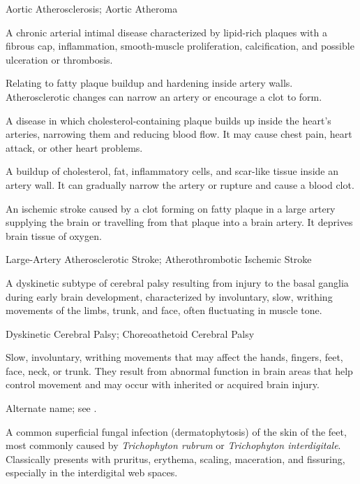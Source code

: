 \synonyms
Aortic Atherosclerosis; Aortic Atheroma

 A chronic arterial intimal disease characterized by lipid-rich plaques with a fibrous cap, inflammation, smooth-muscle proliferation, calcification, and possible ulceration or thrombosis.

 Relating to fatty plaque buildup and hardening inside artery walls. Atherosclerotic changes can narrow an artery or encourage a clot to form.

 A disease in which cholesterol-containing plaque builds up inside the heart’s arteries, narrowing them and reducing blood flow. It may cause chest pain, heart attack, or other heart problems.

 A buildup of cholesterol, fat, inflammatory cells, and scar-like tissue inside an artery wall. It can gradually narrow the artery or rupture and cause a blood clot.

 An ischemic stroke caused by a clot forming on fatty plaque in a large artery supplying the brain or travelling from that plaque into a brain artery. It deprives brain tissue of oxygen.

\synonyms
Large-Artery Atherosclerotic Stroke; Atherothrombotic Ischemic Stroke

 A dyskinetic subtype of cerebral palsy resulting from injury to the basal ganglia during early brain development, characterized by involuntary, slow, writhing movements of the limbs, trunk, and face, often fluctuating in muscle tone.

\synonyms
Dyskinetic Cerebral Palsy; Choreoathetoid Cerebral Palsy

 Slow, involuntary, writhing movements that may affect the hands, fingers, feet, face, neck, or trunk. They result from abnormal function in brain areas that help control movement and may occur with inherited or acquired brain injury.

 Alternate name; see .

 A common superficial fungal infection (dermatophytosis) of the skin of the feet, most commonly caused by \textit{Trichophyton rubrum} or \textit{Trichophyton interdigitale}. Classically presents with pruritus, erythema, scaling, maceration, and fissuring, especially in the interdigital web spaces.

